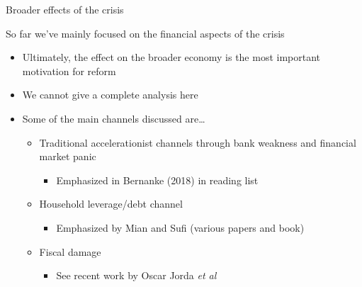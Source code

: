 \begin{frame}{Broader effects of the crisis}

So far we've mainly focused on the financial aspects of the crisis
\begin{itemize}
\item	Ultimately, the effect on the broader economy is the most important motivation for reform
\item	We cannot give a complete analysis here
\item	Some of the main channels discussed are\ldots
	\begin{itemize}
	\item	Traditional accelerationist channels through bank weakness and financial market panic
		\begin{itemize}
		\item	Emphasized in Bernanke (2018) in reading list
		\end{itemize}
	\item	Household leverage/debt channel
		\begin{itemize}
		\item	Emphasized by Mian and Sufi (various papers and book)
		\end{itemize}
	\item	Fiscal damage 
		\begin{itemize}
		\item	See recent work by Oscar Jorda \emph{et al}
		\end{itemize}
	\end{itemize}
\end{itemize}

\end{frame}




